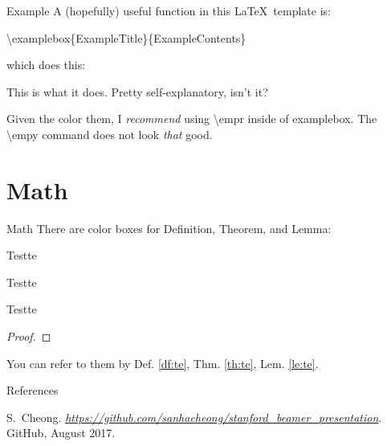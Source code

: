 \documentclass[pdf]{beamer}
\newcommand{\empy}[1]{{\color{DKULightBlue}\emph{#1}}}
\newcommand{\empr}[1]{{\color{DKUDarkBlue}\emph{#1}}}
\theoremstyle{remark}
\theoremstyle{definition}
\newcommand{\examplebox}[2]{
\begin{tcolorbox}[colframe=DKUDarkGreen,colback=boxgray,title=#1]
#2
\end{tcolorbox}}
\begin{document}
\begin{frame}{Example}
A (hopefully) useful function in this \LaTeX~template is:
\begin{center}
	\textbackslash examplebox\{ExampleTitle\}\{ExampleContents\}
\end{center}
which does this:
\examplebox{Example of the Command \textbackslash examplebox}{
This is what it does. Pretty self-explanatory, isn't it?

Given the color them, I \empr{recommend} using \textbackslash empr inside of examplebox. The \textbackslash empy command does not look \empy{that} good.
}
\end{frame}

\section{Math}
\begin{frame}{Math}
There are color boxes for Definition, Theorem, and Lemma:
\begin{defi}{Test}{te}
\end{defi}
\begin{thm}{Test}{te}
\end{thm}
\begin{lem}{Test}{te}
\end{lem}
\begin{proof}
\end{proof}

You can refer to them by Def. \ref{df:te}, Thm. \ref{th:te}, Lem. \ref{le:te}. 
\end{frame}



\begin{frame}{References}
\begin{thebibliography}{3}
	S.~Cheong. \empr{\href{https://github.com/sanhacheong/stanford_beamer_template}{https://github.com/sanhacheong/stanford\_beamer\_presentation}}. {GitHub}, August 2017.
\end{thebibliography}
\end{frame}
\end{document}
